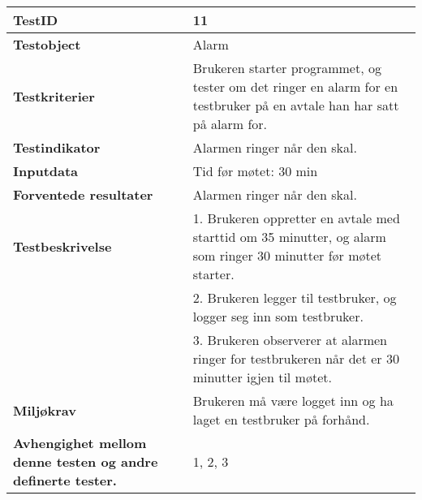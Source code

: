 	\begin{tabularx}{1.2\textwidth}{| p{5cm} | X |}
	\hline
	\textbf{TestID} 																& 11																	\\ \hline
	\textbf{Testobject} 															& Alarm															\\ \hline
	\textbf{Testkriterier} 															&Brukeren starter programmet, og tester om det ringer en alarm for en testbruker på en avtale han har satt på alarm for.						\\ \hline
	\textbf{Testindikator} 															& Alarmen ringer når den skal.													\\ \hline
	\textbf{Inputdata} 															& Tid før møtet: 30 min														\\  \hline
	\textbf{Forventede resultater}									 				& Alarmen ringer når den skal.				\\ \hline
	\textbf{Testbeskrivelse} 														& 1. Brukeren oppretter en avtale med starttid om 35 minutter, og alarm som ringer 30 minutter før møtet starter.\\
																			& 2. Brukeren legger til testbruker, og logger seg inn som testbruker.\\
																			& 3. Brukeren observerer at alarmen ringer for testbrukeren når det er 30 minutter igjen til møtet.					\\ \hline
	\textbf{Miljøkrav}			 												& Brukeren må være logget inn og ha laget en testbruker på forhånd.						\\ \hline
	\textbf{Avhengighet mellom denne testen og andre definerte tester.}		 				& 1, 2, 3				 													\\ \hline
	\end{tabularx}